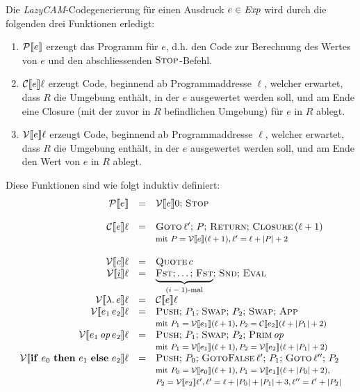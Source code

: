 \documentclass[12pt,fleqn]{article}
\begin{document}
Die {\em LazyCAM}-Codegenerierung f\"ur einen Ausdruck $e\in{\text{\it Exp\/}}$ wird durch die folgenden drei Funktionen erledigt:
\begin{enumerate}
\item $\mathcal{P}\llbracket e \rrbracket$ erzeugt das Programm f\"ur $e$, d.h. den Code zur Berechnung des Wertes von $e$ und
  den abschliessenden $\textsc{Stop}$-Befehl.
\item $\mathcal{C}\llbracket e \rrbracket\ell$ erzeugt Code, beginnend ab Programmaddresse $\ell$, welcher erwartet, dass $R$ die
  Umgebung enth\"alt, in der $e$ ausgewertet werden soll, und am Ende eine Closure (mit der zuvor in $R$ befindlichen
  Umgebung) f\"ur $e$ in $R$ ablegt.
\item $\mathcal{V}\llbracket e \rrbracket\ell$ erzeugt Code, beginnend ab Programmaddresse $\ell$, welcher erwartet, dass $R$ die
  Umgebung enth\"alt, in der $e$ ausgewertet werden soll, und am Ende den Wert von $e$ in $R$ ablegt.
\end{enumerate}
Diese Funktionen sind wie folgt induktiv definiert:
\[\begin{array}{rcl}
  \mathcal{P}\llbracket e \rrbracket
  &=& \mathcal{V}\llbracket e \rrbracket0;\,\textsc{Stop} \\
  \\
  \mathcal{C}\llbracket e \rrbracket\ell
  &=& \textsc{Goto}\,\ell';\,P;\,\textsc{Return};\,\textsc{Closure}\,(\ell+1) \\
  && \footnotesize{\text{mit $P = \mathcal{V}\llbracket e \rrbracket(\ell+1), \ell' = \ell + |P| + 2$}} \\
  \\
  \mathcal{V}\llbracket c \rrbracket\ell
  &=& \textsc{Quote}\,c \\

  \mathcal{V}\llbracket \underline{i} \rrbracket\ell
  &=& \underbrace{\textsc{Fst};\ldots;\,\textsc{Fst}}_{\text{$(i-1)$-mal}};\,\textsc{Snd};\,\textsc{Eval} \\

  \mathcal{V}\llbracket \lambda .\,e \rrbracket\ell
  &=& \mathcal{C}\llbracket e \rrbracket\ell \\

  \mathcal{V}\llbracket e_1\,e_2 \rrbracket\ell
  &=& \textsc{Push};\,P_1;\,\textsc{Swap};\,P_2;\,\textsc{Swap};\,\textsc{App} \\
  && {\footnotesize \text{mit $P_1=\mathcal{V}\llbracket e_1 \rrbracket(\ell+1),P_2=\mathcal{C}\llbracket e_2 \rrbracket(\ell+|P_1|+2)$}} \\

  \mathcal{V}\llbracket e_1\,{\text{\it op\/}}\,e_2 \rrbracket\ell
  &=& \textsc{Push};\,P_1;\,\textsc{Swap};\,P_2;\,\textsc{Prim}\,{\text{\it op\/}} \\
  && {\footnotesize \text{mit $P_1=\mathcal{V}\llbracket e_1 \rrbracket(\ell+1),P_2=\mathcal{V}\llbracket e_2 \rrbracket(\ell+|P_1|+2)$}} \\

  \mathcal{V}\llbracket \mathbf{if}\ e_0\ \mathbf{then}\ e_1\ \mathbf{else}\ e_2 \rrbracket\ell
  &=& \textsc{Push};\,P_0;\,\textsc{GotoFalse}\,\ell';\,P_1;\,\textsc{Goto}\,\ell'';\,P_2 \\
  && {\footnotesize \text{mit $P_0=\mathcal{V}\llbracket e_0 \rrbracket(\ell+1),P_1=\mathcal{V}\llbracket e_1 \rrbracket(\ell+|P_0|+2),$}} \\
  && {\footnotesize \text{$P_2=\mathcal{V}\llbracket e_2 \rrbracket\ell',\ell'=\ell+|P_0|+|P_1|+3,\ell''=\ell'+|P_2|$}}
\end{array}\]
\end{document}
